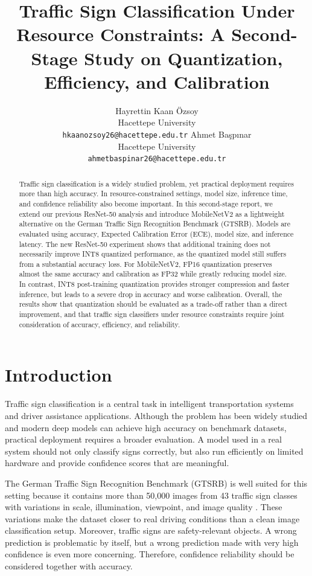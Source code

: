 \documentclass{article} %
\title{Traffic Sign Classification Under Resource Constraints: 
A Second-Stage Study on Quantization, Efficiency, and Calibration}
\author{
\hspace*{-0.25em}Hayrettin Kaan Özsoy \\
Hacettepe University \\
\texttt{hkaanozsoy26@hacettepe.edu.tr}
\And
Ahmet Başpınar \\
Hacettepe University \\
\texttt{ahmetbaspinar26@hacettepe.edu.tr}
}
\begin{document}
\maketitle

\begin{abstract}
Traffic sign classification is a widely studied problem, yet practical deployment requires more than high accuracy. In resource-constrained settings, model size, inference time, and confidence reliability also become important. In this second-stage report, we extend our previous ResNet-50 analysis and introduce MobileNetV2 as a lightweight alternative on the German Traffic Sign Recognition Benchmark (GTSRB). Models are evaluated using accuracy, Expected Calibration Error (ECE), model size, and inference latency. The new ResNet-50 experiment shows that additional training does not necessarily improve INT8 quantized performance, as the quantized model still suffers from a substantial accuracy loss. For MobileNetV2, FP16 quantization preserves almost the same accuracy and calibration as FP32 while greatly reducing model size. In contrast, INT8 post-training quantization provides stronger compression and faster inference, but leads to a severe drop in accuracy and worse calibration. Overall, the results show that quantization should be evaluated as a trade-off rather than a direct improvement, and that traffic sign classifiers under resource constraints require joint consideration of accuracy, efficiency, and reliability.
\end{abstract}

\section{Introduction}

Traffic sign classification is a central task in intelligent transportation systems and driver assistance applications. Although the problem has been widely studied and modern deep models can achieve high accuracy on benchmark datasets, practical deployment requires a broader evaluation. A model used in a real system should not only classify signs correctly, but also run efficiently on limited hardware and provide confidence scores that are meaningful.

The German Traffic Sign Recognition Benchmark (GTSRB) is well suited for this setting because it contains more than 50,000 images from 43 traffic sign classes with variations in scale, illumination, viewpoint, and image quality \citep{stallkamp2011gtsrb}. These variations make the dataset closer to real driving conditions than a clean image classification setup. Moreover, traffic signs are safety-relevant objects. A wrong prediction is problematic by itself, but a wrong prediction made with very high confidence is even more concerning. Therefore, confidence reliability should be considered together with accuracy.
\end{document}
